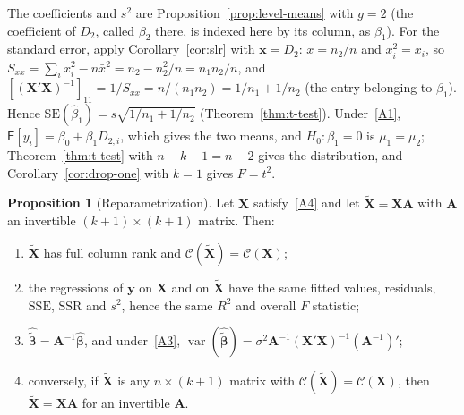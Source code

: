 \documentclass[12pt,a4paper]{article}
\makeatletter
\theoremstyle{definition}
\newtheorem{proposition}[theorem]{Proposition}
\renewenvironment{proof}[1][\proofname]{\par
  \pushQED{\qed}%
  \normalfont \topsep6\p@\@plus6\p@\relax
  \trivlist
  \item[\hskip\labelsep\bfseries #1\@addpunct{.}]\ignorespaces
}{%
  \popQED\endtrivlist\@endpefalse
}
\newcommand\expc{\mathsf{E}}
\DeclareMathOperator\var{var}
\newcommand{\SSR}{\mathrm{SSR}}
\newcommand{\SSE}{\mathrm{SSE}}
\newcommand{\SE}{\mathrm{SE}}
\newcommand{\bX}{\mathbf{X}}
\newcommand{\by}{\mathbf{y}}
\newcommand{\bx}{\mathbf{x}}
\def\bb{\boldsymbol{\beta}}
\newcommand{\bA}{\mathbf{A}}
\newcommand{\calC}{\mathcal{C}}
\makeatother
\begin{document}
\begin{proof}
The coefficients and $s^2$ are Proposition~\ref{prop:level-means} with $g = 2$ (the coefficient of $D_2$, called $\beta_2$ there, is indexed here by its column, as $\beta_1$). For the standard error, apply Corollary~\ref{cor:slr} with $\bx = D_2$: $\bar x = n_2/n$ and $x_i^2 = x_i$, so $S_{xx} = \sum_i x_i^2 - n\bar x^2 = n_2 - n_2^2/n = n_1n_2/n$, and $[(\bX'\bX)^{-1}]_{11} = 1/S_{xx} = n/(n_1n_2) = 1/n_1 + 1/n_2$ (the entry belonging to $\beta_1$). Hence $\SE(\hat\beta_1) = s\sqrt{1/n_1 + 1/n_2}$ (Theorem~\ref{thm:t-test}). Under~\ref{A1}, $\expc[y_i] = \beta_0 + \beta_1D_{2,i}$, which gives the two means, and $H_0\colon \beta_1 = 0$ is $\mu_1 = \mu_2$; Theorem~\ref{thm:t-test} with $n - k - 1 = n - 2$ gives the distribution, and Corollary~\ref{cor:drop-one} with $k = 1$ gives $F = t^2$.
\end{proof}

\begin{proposition}[Reparametrization]\label{prop:reparam}
Let $\bX$ satisfy~\ref{A4} and let $\tilde{\bX} = \bX\bA$ with $\bA$ an invertible $(k+1) \times (k+1)$ matrix. Then:
\begin{enumerate}[label=\textup{(\roman*)}]
\item $\tilde{\bX}$ has full column rank and $\calC(\tilde{\bX}) = \calC(\bX)$;
\item\label{rp:ii} the regressions of $\by$ on $\bX$ and on $\tilde{\bX}$ have the same fitted values, residuals, $\SSE$, $\SSR$ and $s^2$, hence the same $R^2$ and overall $F$ statistic;
\item\label{rp:iii} $\hat{\tilde{\bb}} = \bA^{-1}\hat{\bb}$, and under~\ref{A3}, $\var(\hat{\tilde{\bb}}) = \sigma^2\bA^{-1}(\bX'\bX)^{-1}(\bA^{-1})'$;
\item\label{rp:iv} conversely, if $\tilde{\bX}$ is any $n \times (k+1)$ matrix with $\calC(\tilde{\bX}) = \calC(\bX)$, then $\tilde{\bX} = \bX\bA$ for an invertible $\bA$.
\end{enumerate}
\end{proposition}
\end{document}
